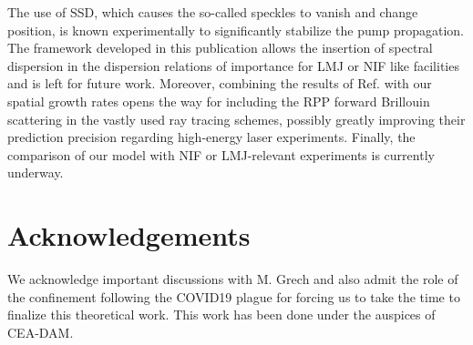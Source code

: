 \documentclass[
 reprint,
 amsmath,amssymb,
 aps,
]{revtex4-1}
\begin{document}
The use of SSD, which  causes the so-called speckles to vanish and change position, is known  experimentally to significantly stabilize the pump propagation. The framework developed in this publication  allows the insertion of spectral dispersion in the dispersion relations of importance for LMJ or NIF like facilities  and is left for future work. Moreover, 
combining the results of  Ref. \cite[]{POP_Debayle_2019} with our spatial growth rates opens the way for 
including the RPP forward Brillouin scattering   in the vastly used ray tracing schemes, possibly greatly improving their prediction precision regarding high-energy laser experiments.
Finally, the comparison of our model with NIF or LMJ-relevant experiments is currently underway. 


\section*{Acknowledgements}
We acknowledge important discussions with M. Grech and also admit the role of the confinement following the COVID19 plague for forcing us to take the time to finalize this theoretical work. This work has been done under the auspices of CEA-DAM. 

\end{document}
